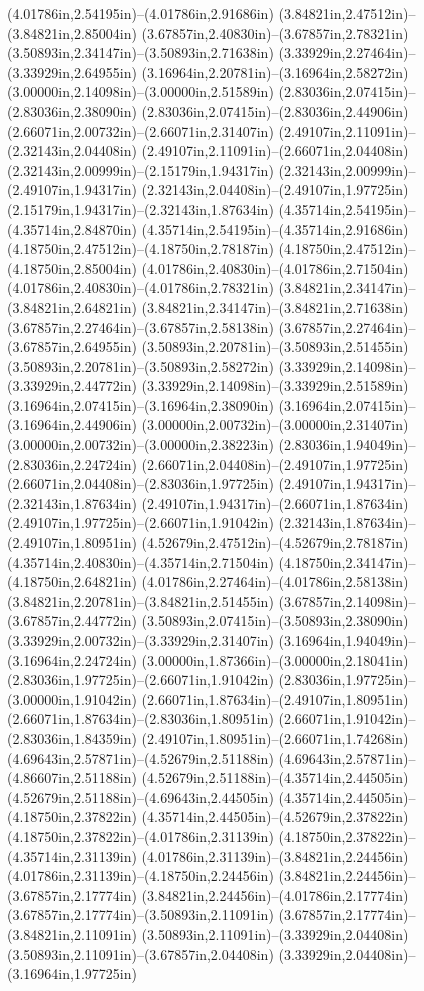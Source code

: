 (4.01786in,2.54195in)--(4.01786in,2.91686in) (3.84821in,2.47512in)--(3.84821in,2.85004in) (3.67857in,2.40830in)--(3.67857in,2.78321in) (3.50893in,2.34147in)--(3.50893in,2.71638in) (3.33929in,2.27464in)--(3.33929in,2.64955in) (3.16964in,2.20781in)--(3.16964in,2.58272in) (3.00000in,2.14098in)--(3.00000in,2.51589in) (2.83036in,2.07415in)--(2.83036in,2.38090in) (2.83036in,2.07415in)--(2.83036in,2.44906in) (2.66071in,2.00732in)--(2.66071in,2.31407in) (2.49107in,2.11091in)--(2.32143in,2.04408in) (2.49107in,2.11091in)--(2.66071in,2.04408in) (2.32143in,2.00999in)--(2.15179in,1.94317in) (2.32143in,2.00999in)--(2.49107in,1.94317in) (2.32143in,2.04408in)--(2.49107in,1.97725in) (2.15179in,1.94317in)--(2.32143in,1.87634in) (4.35714in,2.54195in)--(4.35714in,2.84870in) (4.35714in,2.54195in)--(4.35714in,2.91686in) (4.18750in,2.47512in)--(4.18750in,2.78187in) (4.18750in,2.47512in)--(4.18750in,2.85004in) (4.01786in,2.40830in)--(4.01786in,2.71504in) (4.01786in,2.40830in)--(4.01786in,2.78321in) (3.84821in,2.34147in)--(3.84821in,2.64821in) (3.84821in,2.34147in)--(3.84821in,2.71638in) (3.67857in,2.27464in)--(3.67857in,2.58138in) (3.67857in,2.27464in)--(3.67857in,2.64955in) (3.50893in,2.20781in)--(3.50893in,2.51455in) (3.50893in,2.20781in)--(3.50893in,2.58272in) (3.33929in,2.14098in)--(3.33929in,2.44772in) (3.33929in,2.14098in)--(3.33929in,2.51589in) (3.16964in,2.07415in)--(3.16964in,2.38090in) (3.16964in,2.07415in)--(3.16964in,2.44906in) (3.00000in,2.00732in)--(3.00000in,2.31407in) (3.00000in,2.00732in)--(3.00000in,2.38223in) (2.83036in,1.94049in)--(2.83036in,2.24724in) (2.66071in,2.04408in)--(2.49107in,1.97725in) (2.66071in,2.04408in)--(2.83036in,1.97725in) (2.49107in,1.94317in)--(2.32143in,1.87634in) (2.49107in,1.94317in)--(2.66071in,1.87634in) (2.49107in,1.97725in)--(2.66071in,1.91042in) (2.32143in,1.87634in)--(2.49107in,1.80951in) (4.52679in,2.47512in)--(4.52679in,2.78187in) (4.35714in,2.40830in)--(4.35714in,2.71504in) (4.18750in,2.34147in)--(4.18750in,2.64821in) (4.01786in,2.27464in)--(4.01786in,2.58138in) (3.84821in,2.20781in)--(3.84821in,2.51455in) (3.67857in,2.14098in)--(3.67857in,2.44772in) (3.50893in,2.07415in)--(3.50893in,2.38090in) (3.33929in,2.00732in)--(3.33929in,2.31407in) (3.16964in,1.94049in)--(3.16964in,2.24724in) (3.00000in,1.87366in)--(3.00000in,2.18041in) (2.83036in,1.97725in)--(2.66071in,1.91042in) (2.83036in,1.97725in)--(3.00000in,1.91042in) (2.66071in,1.87634in)--(2.49107in,1.80951in) (2.66071in,1.87634in)--(2.83036in,1.80951in) (2.66071in,1.91042in)--(2.83036in,1.84359in) (2.49107in,1.80951in)--(2.66071in,1.74268in) (4.69643in,2.57871in)--(4.52679in,2.51188in) (4.69643in,2.57871in)--(4.86607in,2.51188in) (4.52679in,2.51188in)--(4.35714in,2.44505in) (4.52679in,2.51188in)--(4.69643in,2.44505in) (4.35714in,2.44505in)--(4.18750in,2.37822in) (4.35714in,2.44505in)--(4.52679in,2.37822in) (4.18750in,2.37822in)--(4.01786in,2.31139in) (4.18750in,2.37822in)--(4.35714in,2.31139in) (4.01786in,2.31139in)--(3.84821in,2.24456in) (4.01786in,2.31139in)--(4.18750in,2.24456in) (3.84821in,2.24456in)--(3.67857in,2.17774in) (3.84821in,2.24456in)--(4.01786in,2.17774in) (3.67857in,2.17774in)--(3.50893in,2.11091in) (3.67857in,2.17774in)--(3.84821in,2.11091in) (3.50893in,2.11091in)--(3.33929in,2.04408in) (3.50893in,2.11091in)--(3.67857in,2.04408in) (3.33929in,2.04408in)--(3.16964in,1.97725in) 